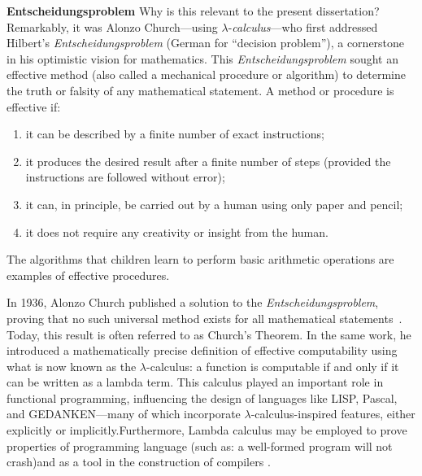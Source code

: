 \noindent \textbf{Entscheidungsproblem}
Why is this relevant to the present dissertation? Remarkably, it was Alonzo Church—using $\lambda$-\textit{calculus}—who first addressed Hilbert’s \emph{Entscheidungsproblem} (German for ``decision problem''), a cornerstone in his  optimistic vision for mathematics\cite{hilbert1938}. This \emph{Entscheidungsproblem} sought an effective method (also called a mechanical procedure or algorithm) to determine the truth or falsity of any mathematical statement. A method or procedure is effective if:
\begin{enumerate}
    \item it can be described by a finite number of exact instructions;
    \item it produces the desired result after a finite number of steps (provided the instructions are followed without error);
    \item it can, in principle, be carried out by a human using only paper and pencil;
    \item it does not require any creativity or insight from the human.
\end{enumerate}
The algorithms that children learn to perform basic arithmetic operations are examples of effective procedures.

 In 1936, Alonzo Church published a solution to the \emph{Entscheidungsproblem}, proving that no such universal method exists for all mathematical statements~\cite{church1936}. Today, this result is often referred to as Church’s Theorem. In the same work, he introduced a mathematically precise definition of effective computability using what is now known as the $\lambda$-calculus: a function is computable if
 and only if it can be written as a lambda term. This calculus played an important role in functional programming, influencing the design of languages like LISP, Pascal, and GEDANKEN—many of which incorporate $\lambda$-calculus-inspired features, either explicitly or implicitly.Furthermore, Lambda calculus may be employed to prove properties of programming language (such as: a well-formed program will not crash)and as a tool in the construction of compilers \cite{jonesImplementationFunctionalProgramming}.



